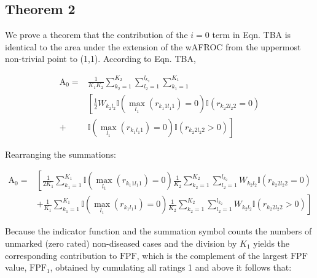 \documentclass[
]{book}
\begin{document}
\hypertarget{empirical-two-theorems-2}{%
\subsection{Theorem 2}\label{empirical-two-theorems-2}}

We prove a theorem that the contribution of the \(i = 0\) term in Eqn. TBA is identical to the area under the extension of the wAFROC from the uppermost non-trivial point to (1,1). According to Eqn. TBA,

\begin{equation}
\begin{aligned}
\text{A}_0 =& \frac{1}{K_1K_2}  \sum_{k_2=1}^{K_2} \sum_{l_2=1}^{l_{k_2}}\sum_{k_1=1}^{K_1} \\
&\left [ \frac{1}{2} W_{k_2l_2} \mathbb{I}\left ( \max_{l_1} \left (r_{k_1 1 l_1 1}  \right ) = 0  \right )\mathbb{I}\left ( r_{k_2 2 l_2 2} = 0 \right ) \right. \\
+& \left. \mathbb{I}\left ( \max_{l_1} \left (r_{k_1 l_1 1}  \right ) = 0  \right )\mathbb{I}\left ( r_{k_2 2 l_2 2} > 0 \right )  \right ]
\end{aligned}
\label{eq:empirical-theorem8}
\end{equation}

Rearranging the summations:

\begin{equation}
\begin{aligned}
\text{A}_0 =& 
\left [ \frac{1}{2K_1} \sum_{k_1=1}^{K_1}\mathbb{I}\left ( \max_{l_1} \left (r_{k_1 1 l_1 1}  \right ) = 0  \right ) \frac{1}{K_2} \sum_{k_2=1}^{K_2} \sum_{l_2=1}^{l_{k_2}} W_{k_2l_2} \mathbb{I}\left ( r_{k_2 2 l_2 2} = 0 \right ) \right. \\
&+ \left. \frac{1}{K_1} \sum_{k_1=1}^{K_1}\mathbb{I}\left ( \max_{l_1} \left (r_{k_1 l_1 1}  \right ) = 0  \right ) \frac{1}{K_2} \sum_{k_2=1}^{K_2} \sum_{l_2=1}^{l_{k_2}} W_{k_2l_2} \mathbb{I}\left ( r_{k_2 2 l_2 2} > 0 \right )  \right ]
\end{aligned}
\label{eq:empirical-theorem9}
\end{equation}

Because the indicator function and the summation symbol counts the numbers of unmarked (zero rated) non-diseased cases and the division by \(K_1\) yields the corresponding contribution to \(\text{FPF}\), which is the complement of the largest \(\text{FPF}\) value, \(\text{FPF}_1\), obtained by cumulating all ratings 1 and above it follows that:
\end{document}
